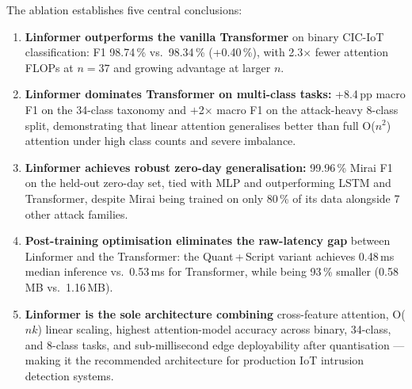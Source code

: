 The ablation establishes five central conclusions:
\begin{enumerate}[noitemsep]
  \item \textbf{Linformer outperforms the vanilla Transformer} on binary
    CIC-IoT classification: F1 98.74\,\% vs.\ 98.34\,\% (+0.40\,\%),
    with 2.3$\times$ fewer attention FLOPs at $n=37$ and growing
    advantage at larger $n$.
  \item \textbf{Linformer dominates Transformer on multi-class tasks:}
    +8.4\,pp macro F1 on the 34-class taxonomy and $+$2$\times$ macro F1
    on the attack-heavy 8-class split, demonstrating that linear attention
    generalises better than full O($n^2$) attention under high class counts
    and severe imbalance.
  \item \textbf{Linformer achieves robust zero-day generalisation:}
    99.96\,\% Mirai F1 on the held-out zero-day set, tied with MLP and
    outperforming LSTM and Transformer, despite Mirai being trained on
    only 80\,\% of its data alongside 7 other attack families.
  \item \textbf{Post-training optimisation eliminates the raw-latency gap}
    between Linformer and the Transformer: the Quant\,+\,Script variant
    achieves 0.48\,ms median inference vs.\ 0.53\,ms for Transformer,
    while being 93\,\% smaller (0.58\,MB vs.\ 1.16\,MB).
  \item \textbf{Linformer is the sole architecture combining}
    cross-feature attention, O($nk$) linear scaling, highest
    attention-model accuracy across binary, 34-class, and 8-class tasks,
    and sub-millisecond edge deployability after quantisation —
    making it the recommended architecture for production IoT intrusion
    detection systems.
\end{enumerate}
